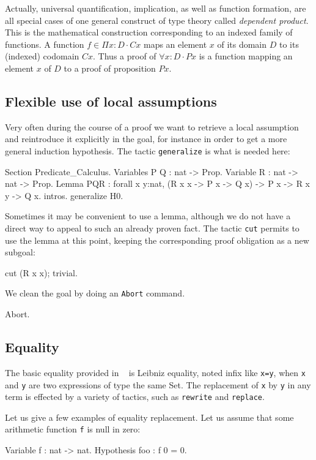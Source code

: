 \documentclass[11pt,a4paper]{book}
\begin{document}
Actually, universal quantification, implication, 
as well as function formation, are
all special cases of one general construct of type theory called
{\sl dependent product}. This is the mathematical construction 
corresponding to an indexed family of functions. A function 
$f\in \Pi x:D\cdot Cx$ maps an element $x$ of its domain $D$ to its
(indexed) codomain $Cx$. Thus a proof of $\forall x:D\cdot Px$ is
a function mapping an element $x$ of $D$ to a proof of proposition $Px$.


\subsection{Flexible use of local assumptions}

Very often during the course of a proof we want to retrieve a local
assumption and reintroduce it explicitly in the goal, for instance
in order to get a more general induction hypothesis. The tactic
\verb:generalize: is what is needed here:

\begin{coq_example}
Section Predicate_Calculus.
Variables P Q : nat -> Prop.
Variable R :  nat -> nat -> Prop.
Lemma PQR :
 forall x y:nat, (R x x -> P x -> Q x) -> P x -> R x y -> Q x.
intros.
generalize H0.
\end{coq_example}

Sometimes it may be convenient to use a lemma, although we do not have
a direct way to appeal to such an already proven fact. The tactic \verb:cut:
permits to use the lemma at this point, keeping the corresponding proof
obligation as a new subgoal:
\begin{coq_example}
cut (R x x); trivial.
\end{coq_example}
We clean the goal by doing an \verb:Abort: command.
\begin{coq_example*}
Abort.
\end{coq_example*}


\subsection{Equality}

The basic equality provided in \Coq~ is Leibniz equality, noted infix like
\verb+x=y+, when \verb:x: and \verb:y: are two expressions of
type the same Set. The replacement of \verb:x: by \verb:y: in any
term is effected by a variety of tactics, such as \verb:rewrite:
and \verb:replace:. 

Let us give a few examples of equality replacement. Let us assume that
some arithmetic function \verb:f: is null in zero:
\begin{coq_example}
Variable f : nat -> nat.
Hypothesis foo : f 0 = 0.
\end{coq_example}
\end{document}
